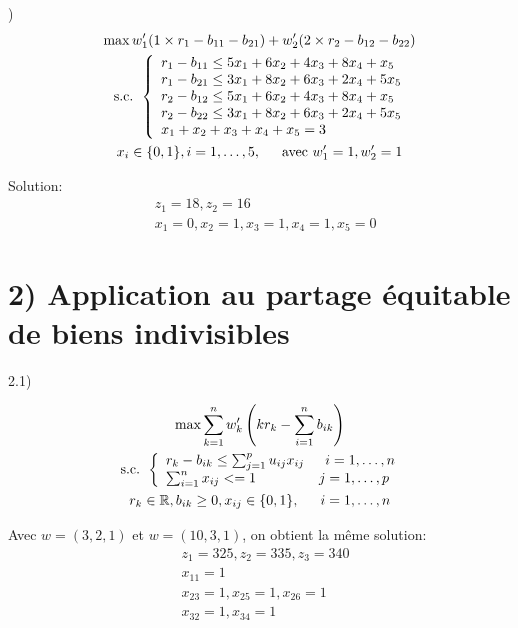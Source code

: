 \documentclass[11pt,A4,french]{article}
\newcommand{\R}{\mathbb{R}}
\begin{document}
)
$$
\begin{gathered}
    \max w_1^{\prime}(1 \times r_1 - b_{11} - b_{21}) + w_2^{\prime}(2 \times r_2 - b_{12} - b_{22}) \\
\text { s.c. }\left\{\begin{array}{l}
r_{1}-b_{11} \leq 5 x_{1}+6 x_{2}+4 x_{3}+8 x_{4}+x_{5} \\
r_{1}-b_{21} \leq 3 x_{1}+8 x_{2}+6 x_{3}+2 x_{4}+5 x_{5} \\
r_{2}-b_{12} \leq 5 x_{1}+6 x_{2}+4 x_{3}+8 x_{4}+x_{5} \\
r_{2}-b_{22} \leq 3 x_{1}+8 x_{2}+6 x_{3}+2 x_{4}+5 x_{5} \\
x_{1}+x_{2}+x_{3}+x_{4}+x_{5}=3 \\
\end{array}\right. \\
x_{i} \in\{0,1\}, i=1, \ldots, 5, \indent \text{avec } w_1^{\prime}=1,w_2^{\prime}=1
\end{gathered}
$$

Solution:
\begin{align*}
&z_1 = 18, z_2 = 16\\
&x_1 = 0, x_2 = 1, x_3 = 1, x_4 = 1, x_5=0   
\end{align*}

\section*{2) Application au partage équitable de biens indivisibles}

2.1)

$$
\begin{gathered}
    \max \sum_{k=1}^{n} w_{k}^{\prime}\left(k r_{k}-\sum_{i=1}^{n} b_{i k}\right) \\
    \text { s.c. }\left\{\begin{array}{lr}
    r_{k}-b_{i k} \leq \sum_{j=1}^p u_{ij}x_{ij} \indent i=1, \ldots, n \\
    \sum_{i=1}^n x_{ij} <= 1 \indent \indent \indent j=1, \ldots, p \\
    \end{array}\right. \\
    r_k \in \R, b_{i k} \geq 0, x_{ij} \in\{0,1\},\indent i=1, \ldots, n
\end{gathered}
$$

Avec $w=(3,2,1)$ et $w=(10,3,1)$, on obtient la même solution:
\begin{align*}
& z_1 = 325, z_2 = 335, z_3 = 340 \\
&x_{11} = 1 \\
&x_{23} = 1, x_{25} = 1, x_{26} = 1 \\
&x_{32} = 1, x_{34} = 1 \\
\end{align*}
\end{document}
